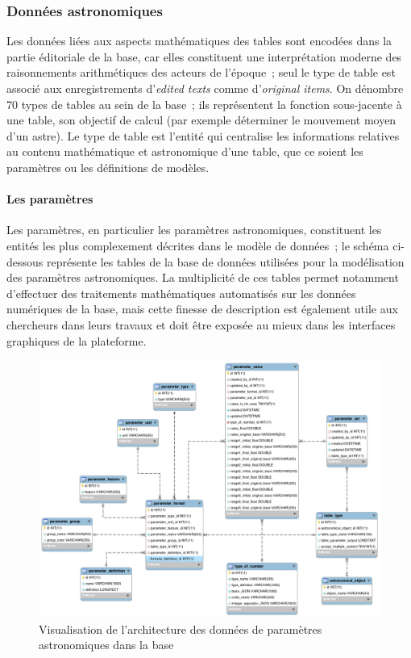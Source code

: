 \documentclass[a4paper,12pt,twoside]{book}
\newcommand{\eng}{\emph}
\newcommand{\ois}{\eng{original items}\xspace}
\begin{document}
			\subsubsection{Données astronomiques}
Les données liées aux aspects mathématiques des tables sont encodées dans la partie éditoriale de la base, car elles constituent une interprétation moderne des raisonnements arithmétiques des acteurs de l'époque~; seul le type de table est associé aux enregistrements d'\eng{edited texts} comme d'\ois. On dénombre 70 types de tables au sein de la base~; ils représentent la fonction sous-jacente à une table, son objectif de calcul (par exemple déterminer le mouvement moyen d'un astre). Le type de table est l'entité qui centralise les informations relatives au contenu mathématique et astronomique d'une table, que ce soient les paramètres ou les définitions de modèles.

				\paragraph{\label{Parametre}Les paramètres}
Les paramètres, en particulier les paramètres astronomiques, constituent les entités les plus complexement décrites dans le modèle de données~; le schéma ci-dessous représente les tables de la base de données utilisées pour la modélisation des paramètres astronomiques. La multiplicité de ces tables permet notamment d'effectuer des traitements mathématiques automatisés sur les données numériques de la base, mais cette finesse de description est également utile aux chercheurs dans leurs travaux et doit être exposée au mieux dans les interfaces graphiques de la plateforme.

\begin{figure}[h!]
	\centering
	\includegraphics[width=13cm]{Images/Astronomical_parameter.png}
	\caption{Visualisation de l'architecture des données de paramètres astronomiques dans la base}
\end{figure}
\end{document}
